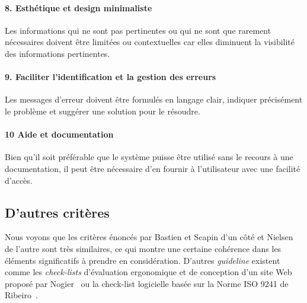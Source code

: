         \paragraph{8. Esthétique et design minimaliste}
            Les informations qui ne sont pas pertinentes ou qui ne sont que rarement nécessaires doivent être limitées ou contextuelles car elles diminuent la visibilité des informations pertinentes.
        \paragraph{9. Faciliter l’identification et la gestion des erreurs}
            Les messages d’erreur doivent être formulés en langage clair, indiquer précisément le problème et suggérer une solution pour le résoudre.
        \paragraph{10 Aide et documentation}
            Bien qu’il soit préférable que le système puisse être utilisé sans le recours à une documentation, il peut être nécessaire d’en fournir à l’utilisateur avec une facilité d’accès.
    \subsection{D'autres critères}
        Nous voyons que les critères énoncés par Bastien et Scapin d'un côté et Nielsen de l'autre sont très similaires, ce qui montre une certaine cohérence dans les éléments significatifs à prendre en considération. D'autres \textit{guideline} existent comme les \textit{check-lists} d'évaluation ergonomique et de conception d'un site Web proposé par Nogier~\cite{nogier2002ergonomie} ou la check-list logicielle basée sur la Norme ISO 9241 de Ribeiro~.

